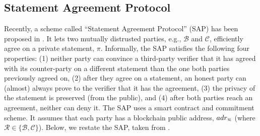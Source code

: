 


\subsection{Statement Agreement Protocol}\label{SAP}

Recently, a scheme called ``Statement Agreement Protocol'' (SAP)  has been proposed in \cite{cryptoeprint:2021:1145}. It   lets two mutually distrusted parties, e.g., $\mathcal{B}$ and $\mathcal{C}$, efficiently agree on a private statement, $\pi$. Informally, the SAP  satisfies the following four  properties: (1) neither party can convince  a third-party  verifier that it has agreed with its counter-party on a different statement than the one both parties previously agreed on, (2) after they  agree on a statement,  an honest party can (almost) always  prove to the verifier that it has the agreement, (3) the privacy of the statement is preserved (from the public), and (4) after both parties reach an agreement, neither can  deny it.  The SAP uses a  smart contract and commitment scheme. It  assumes that each party  has a blockchain public address,  $adr_{\scriptscriptstyle\mathcal{R}}$ (where $\mathcal{R}\in\{\mathcal{B,C}\}$). Below, we restate  the  SAP, taken from \cite{cryptoeprint:2021:1145}. 


